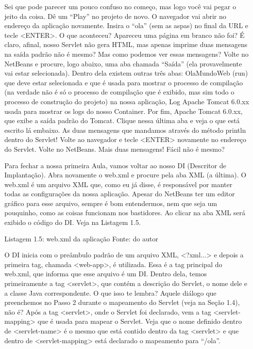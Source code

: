 Sei que pode parecer um pouco confuso no começo, mas logo você vai pegar o jeito da coisa. Dê um ``Play'' no projeto de novo. O navegador vai abrir no endereço da aplicação novamente. Insira o ``ola'' (sem as aspas) no final da URL e tecle <ENTER>. O que aconteceu? Apareceu uma página em branco não foi? É claro, afinal, nosso Servlet não gera HTML, mas apenas imprime duas mensagens na saída padrão não é mesmo? Mas como podemos ver essas mensagens? Volte no NetBeans e procure, logo abaixo, uma aba chamada ``Saída'' (ela provavelmente vai estar selecionada). Dentro dela existem outras três abas: OlaMundoWeb (run) que deve estar selecionada e que é usada para mostrar o processo de compilação (na verdade não é só o processo de compilação que é exibido, mas sim todo o processo de construção do projeto) na nossa aplicação, Log Apache Tomcat 6.0.xx usada para mostrar os logs do nosso Container. Por fim, Apache Tomcat 6.0.xx, que exibe a saída padrão do Tomcat. Clique nessa última aba e veja o que está escrito lá embaixo. As duas mensagens que mandamos através do método println dentro do Servlet! Volte ao navegador e tecle <ENTER> novamente no endereço do Servlet. Volte no NetBeans. Mais duas mensagens! Fácil não é mesmo?

Para fechar a nossa primeira Aula, vamos voltar ao nosso DI (Descritor de Implantação). Abra novamente o web.xml e procure pela aba XML (a última). O web.xml é um arquivo XML que, como eu já disse, é responsável por manter todas as configurações da nossa aplicação. Apesar do NetBeans ter um editor gráfico para esse arquivo, sempre é bom entendermos, nem que seja um pouquinho, como as coisas funcionam nos bastidores. Ao clicar na aba XML será exibido o código do DI. Veja na Listagem 1.5.

Listagem 1.5: web.xml da aplicação
Fonte: do autor

O DI inicia com o preâmbulo padrão de um arquivo XML, <?xml...> e depois a primeira tag, chamada <web-app>, é utilizada. Essa é a tag principal do web.xml, que informa que esse arquivo é um DI. Dentro dela, temos primeiramente a tag <servlet>, que contém a descrição do Servlet, o nome dele e a classe Java correspondente. O que isso te lembra? Aquele diálogo que preenchemos no Passo 2 durante o mapeamento do Servlet (veja na Seção 1.4), não é? Após a tag <servlet>, onde o Servlet foi declarado, vem a tag <servlet-mapping> que é usada para mapear o Servlet. Veja que o nome definido dentro de <servlet-name> é o mesmo que está contido dentro da tag <servlet> e que dentro de <servlet-mapping> está declarado o mapeamento para ``/ola''.

